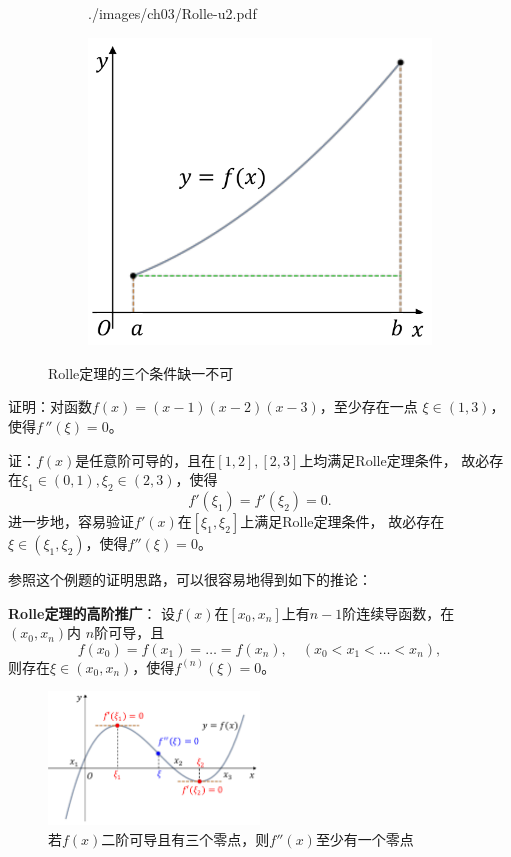 \begin{figure}[h]
\begin{subfigure}[t]{0.3\textwidth}
		{./images/ch03/Rolle-u2.pdf}
	\end{subfigure}\quad
	\begin{subfigure}[t]{0.3\textwidth}
		\centering
		\includegraphics[width=\textwidth]
		{./images/ch03/Rolle-u3.pdf}
	\end{subfigure}
	\caption{Rolle定理的三个条件缺一不可}
	\label{fig:Rolle-u123}
\end{figure}

\bs
\egz 证明：对函数$f(x)=(x-1)(x-2)(x-3)$，至少存在一点
$\xi\in(1,3)$，使得$f\,''(\xi)=0$。

证：$f(x)$是任意阶可导的，且在$[1,2],[2,3]$上均满足Rolle定理条件，
故必存在$\xi_1\in(0,1),\xi_2\in(2,3)$，使得
$$f'(\xi_1)=f'(\xi_2)=0.$$
进一步地，容易验证$f'(x)$在$[\xi_1,\xi_2]$上满足Rolle定理条件，
故必存在$\xi\in(\xi_1,\xi_2)$，使得$f''(\xi)=0$。
\fin

参照这个例题的证明思路，可以很容易地得到如下的推论：

\begin{thx}
	{\bf Rolle定理的高阶推广}：
	设$f(x)$在$[x_0,x_n]$上有$n-1$阶连续导函数，在$(x_0,x_n)$内
	$n$阶可导，且
	$$f(x_0)=f(x_1)=\ldots=f(x_n),\quad(x_0<x_1<\ldots<x_n),$$
	则存在$\xi\in(x_0,x_n)$，使得$f^{(n)}(\xi)=0$。
\end{thx}
	
\begin{figure}[h]
	\centering
	\includegraphics[width=0.5\textwidth]
	{./Images/Ch03/fxixixi.pdf}
	\caption{若$f(x)$二阶可导且有三个零点，则$f''(x)$至少有一个零点}
	\label{fig:fxixixi}
\end{figure}

